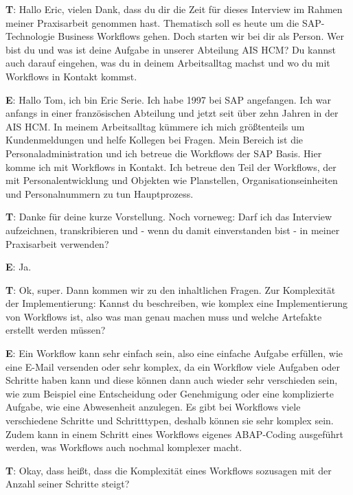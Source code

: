 \begin{list}{X:}{\setlength{\labelsep}{5mm}}
    \linenumbers[1]
    \item[\textbf{T}:] Hallo Eric, vielen Dank, dass du dir die Zeit für dieses Interview im Rahmen meiner Praxisarbeit genommen hast. Thematisch soll es heute um die SAP-Technologie Business Workflows gehen. Doch starten wir bei dir als Person. Wer bist du und was ist deine Aufgabe in unserer Abteilung AIS HCM? Du kannst auch darauf eingehen, was du in deinem Arbeitsalltag machst und wo du mit Workflows in Kontakt kommst.
    \item[\textbf{E}:] Hallo Tom, ich bin Eric Serie. Ich habe 1997 bei SAP angefangen. Ich war anfangs in einer französischen Abteilung und jetzt seit über zehn Jahren in der AIS HCM. In meinem Arbeitsalltag kümmere ich mich grö{\ss}tenteils um Kundenmeldungen und helfe Kollegen bei Fragen. Mein Bereich ist die Personaladministration und ich betreue die Workflows der SAP Basis. Hier komme ich mit Workflows in Kontakt. Ich betreue den Teil der Workflows, der mit Personalentwicklung und Objekten wie Planstellen, Organisationseinheiten und Personalnummern zu tun Hauptprozess.
    \item[\textbf{T}:] Danke für deine kurze Vorstellung. Noch vorneweg: Darf ich das Interview aufzeichnen, transkribieren und - wenn du damit einverstanden bist - in meiner Praxisarbeit verwenden? 
    \item[\textbf{E}:] Ja.
    \item[\textbf{T}:] Ok, super. Dann kommen wir zu den inhaltlichen Fragen. Zur Komplexität der Implementierung: Kannst du beschreiben, wie komplex eine Implementierung von Workflows ist, also was man genau machen muss und welche Artefakte erstellt werden müssen?
    \item[\textbf{E}:] Ein Workflow kann sehr einfach sein, also eine einfache Aufgabe erfüllen, wie \zB eine E-Mail versenden oder sehr komplex, da ein Workflow viele Aufgaben oder Schritte haben kann und diese können dann auch wieder sehr verschieden sein, wie zum Beispiel eine Entscheidung oder Genehmigung oder eine komplizierte Aufgabe, wie eine Abwesenheit anzulegen. Es gibt bei Workflows viele verschiedene Schritte und Schritttypen, deshalb können sie sehr komplex sein. Zudem kann in einem Schritt eines Workflows eigenes ABAP-Coding ausgeführt werden, was Workflows auch nochmal komplexer macht.
    \item[\textbf{T}:] Okay, dass hei{\ss}t, dass die Komplexität eines Workflows sozusagen mit der Anzahl seiner Schritte steigt? 

\end{list}
